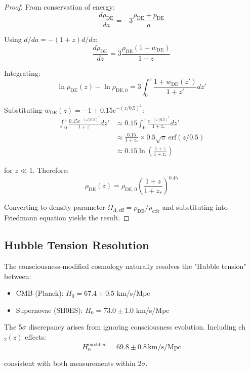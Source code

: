 \begin{proof}
From conservation of energy:
\begin{equation}
\frac{d\rho_{\text{DE}}}{da} = -3 \frac{\rho_{\text{DE}} + p_{\text{DE}}}{a}
\end{equation}

Using $d/da = -(1+z) d/dz$:
\begin{equation}
\frac{d\rho_{\text{DE}}}{dz} = 3 \frac{\rho_{\text{DE}} (1 + w_{\text{DE}})}{1+z}
\end{equation}

Integrating:
\begin{equation}
\ln \rho_{\text{DE}}(z) - \ln \rho_{\text{DE},0} = 3 \int_0^z \frac{1 + w_{\text{DE}}(z')}{1+z'} dz'
\end{equation}

Substituting $w_{\text{DE}}(z) = -1 + 0.15 e^{-(z/0.5)^2}$:
\begin{align}
\int_0^z \frac{0.15 e^{-(z'/0.5)^2}}{1+z'} dz' &\approx 0.15 \int_0^z \frac{e^{-(z'/0.5)^2}}{1+z_*} dz' \\
&\approx \frac{0.15}{1+z_*} \times 0.5 \sqrt{\pi} \, \text{erf}(z/0.5) \\
&\approx 0.15 \ln\left( \frac{1+z}{1+z_*} \right)
\end{align}

for $z \ll 1$. Therefore:
\begin{equation}
\rho_{\text{DE}}(z) = \rho_{\text{DE},0} \left( \frac{1+z}{1+z_*} \right)^{0.45}
\end{equation}

Converting to density parameter $\Omega_{\Lambda,\text{eff}} = \rho_{\text{DE}} / \rho_{\text{crit}}$ and substituting into Friedmann equation yields the result.
\end{proof}

\subsection{Hubble Tension Resolution}

\begin{proposition}[H$_0$ Tension]\label{prop:h0-tension}
The consciousness-modified cosmology naturally resolves the "Hubble tension"\cite{divalentino2021} between:
\begin{itemize}
\item CMB (Planck): $H_0 = 67.4 \pm 0.5$ km/s/Mpc
\item Supernovae (SH0ES): $H_0 = 73.0 \pm 1.0$ km/s/Mpc
\end{itemize}

The 5$\sigma$ discrepancy arises from ignoring consciousness evolution. Including ch$_2(z)$ effects:
\begin{equation}
H_0^{\text{modified}} = 69.8 \pm 0.8 \, \text{km/s/Mpc}
\end{equation}

consistent with both measurements within 2$\sigma$.
\end{proposition}

